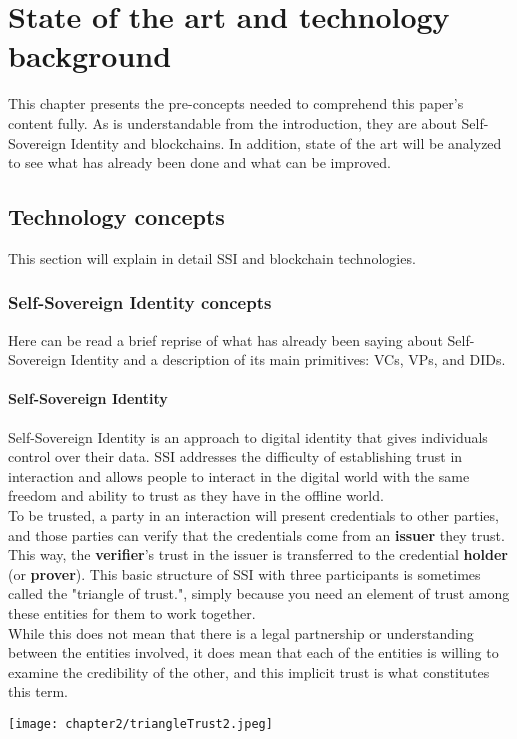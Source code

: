 
\chapter{State of the art and technology background}
This chapter presents the pre-concepts needed to comprehend this paper's content fully.
As is understandable from the introduction, they are about Self-Sovereign Identity and 
blockchains. In addition, state of the art will be analyzed to see what has already been
done and what can be improved.
\section{Technology concepts}
This section will explain in detail SSI and blockchain technologies.
\subsection{Self-Sovereign Identity concepts}
Here can be read a brief reprise of what has already been saying about Self-Sovereign 
Identity and a description of its main primitives: VCs, VPs, and DIDs.
\subsubsection{Self-Sovereign Identity}
Self-Sovereign Identity is an approach to digital identity that gives individuals 
control over their data. SSI addresses the difficulty of establishing trust in 
interaction and allows people to interact in the digital world with the same freedom 
and ability to trust as they have in the offline world.
\vspace*{0.3cm}\\
To be trusted, a party in an interaction will present credentials to other parties, 
and those parties can verify that the credentials come from an \textbf{issuer} they trust.
This way, the \textbf{verifier}'s trust in the issuer is transferred to the credential 
\textbf{holder} (or \textbf{prover}). This basic structure of SSI with three participants 
is sometimes called the "triangle of trust.", simply because you need an element of trust
among these entities for them to work together.
\vspace*{0.3cm}\\
While this does not mean that there is a legal partnership or understanding between the 
entities involved, it does mean that each of the entities is willing to examine the 
credibility of the other, and this implicit trust is what constitutes this term.
\begin{center}
    \texttt{[image: chapter2/triangleTrust2.jpeg]}
\end{center}
